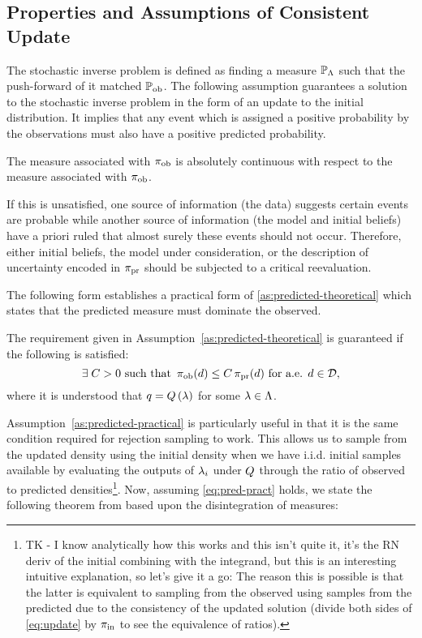 \subsection{Properties and Assumptions of Consistent Update}\label{sec:properties}

The stochastic inverse problem is defined as finding a measure $\mathbb{P}_{\Lambda}$ such that the push-forward of it matched $\operatorname*{\mathbb{P}_{ob}}$.
The following assumption guarantees a solution to the stochastic inverse problem in the form of an update to the initial distribution.
It implies that any event which is assigned a positive probability by the observations must also have a positive predicted probability.

\begin{assumption}\label{as:predicted-theoretical}
  The measure associated with $\operatorname*{\pi_{ob}}$ is absolutely continuous with respect to the measure associated with $\operatorname*{\pi_{ob}}$.
\end{assumption}

If this is unsatisfied, one source of information (the data) suggests certain events are probable while another source of information (the model and initial beliefs) have a priori ruled that almost surely these events should not occur.
Therefore, either initial beliefs, the model under consideration, or the description of uncertainty encoded in $\operatorname*{\pi_{pr}}$ should be subjected to a critical reevaluation.

The following form establishes a practical form of \ref{as:predicted-theoretical} which states that the predicted measure must dominate the observed.
\begin{assumption}\label{as:predicted-practical}
The requirement given in Assumption~\ref{as:predicted-theoretical} is guaranteed if the following is satisfied:
\begin{equation}\label{eq:pred-pract}
  \exists \; C>0 \text{ such that } \operatorname*{\pi_{ob}} (d) \leq C \operatorname*{\pi_{pr}}(d) \text{ for a.e. } d\in \mathcal{D},
\end{equation}
where it is understood that $q = Q\left ( \lambda \right )$ for some $\lambda \in {\Lambda}$.
\end{assumption}

Assumption~\ref{as:predicted-practical} is particularly useful in that it is the same condition required for rejection sampling to work.
This allows us to sample from the updated density using the initial density when we have i.i.d. initial samples available by evaluating the outputs of $\lambda_i$ under $Q$ through the ratio of observed to predicted densities\footnote{ TK - I know analytically how this works and this isn't quite it, it's the RN deriv of the initial combining with the integrand, but this is an interesting intuitive explanation, so let's give it a go: The reason this is possible is that the latter is equivalent to sampling from the observed using samples from the predicted due to the consistency of the updated solution (divide both sides of \eqref{eq:update} by $\operatorname*{\pi_{in}}$ to see the equivalence of ratios).}.
Now, assuming \eqref{eq:pred-pract} holds, we state the following theorem from \cite{BJW18} based upon the disintegration of measures:


